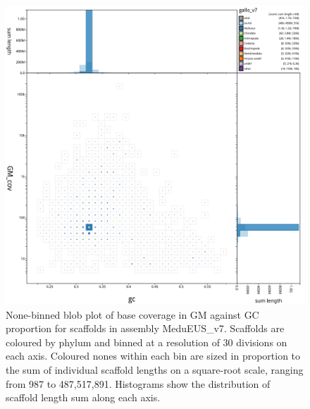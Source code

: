 \documentclass[11pt, a4paper]{article}
\begin{document}
\begin{figure}
	\includegraphics[width=\linewidth]{figures/btk_blob_MgalMED_v7}
	\caption{None-binned blob plot of base coverage in GM against GC proportion for scaffolds in assembly MeduEUS\_v7. Scaffolds are coloured by phylum and binned at a resolution of 30 divisions on each axis. Coloured nones within each bin are sized in proportion to the sum of individual scaffold lengths on a square-root scale, ranging from 987 to 487,517,891. Histograms show the distribution of scaffold length sum along each axis.}
	\label{supfig:btk-blob-MeduEUS}
\end{figure}
\end{document}
